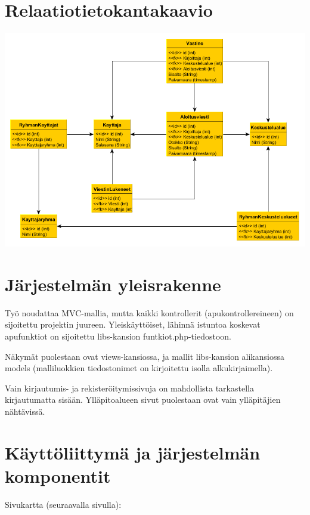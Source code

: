 \documentclass[12pt,a4paper,leqno]{report}
\begin{document}
\chapter{Relaatiotietokantakaavio}

\begin{center}
\includegraphics[scale=0.55]{relaatiotietokantakaavio}
\end{center}

\chapter{Järjestelmän yleisrakenne}

Työ noudattaa MVC-mallia, mutta kaikki kontrollerit (apukontrollereineen) on sijoitettu projektin juureen. Yleiskäyttöiset, lähinnä istuntoa koskevat apufunktiot on sijoitettu libs-kansion funtkiot.php-tiedostoon.

Näkymät puolestaan ovat views-kansiossa, ja mallit libs-kansion alikansiossa models (malliluokkien tiedostonimet on kirjoitettu isolla alkukirjaimella).

Vain kirjautumis- ja rekisteröitymissivuja on mahdollista tarkastella kirjautumatta sisään. Ylläpitoalueen sivut puolestaan ovat vain ylläpitäjien nähtävissä.

\chapter{Käyttöliittymä ja järjestelmän komponentit}

Sivukartta (seuraavalla sivulla):
\end{document}
